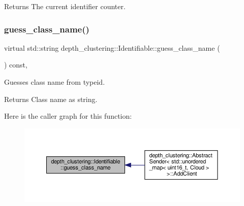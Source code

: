 \begin{DoxyReturn}{Returns}
The current identifier counter. 
\end{DoxyReturn}
\mbox{\label{classdepth__clustering_1_1Identifiable_a3de92b22eb8d77cf80a50998a84ecd8a}} 
\subsubsection{\texorpdfstring{guess\+\_\+class\+\_\+name()}{guess\_class\_name()}}
{\footnotesize\ttfamily virtual std\+::string depth\+\_\+clustering\+::\+Identifiable\+::guess\+\_\+class\+\_\+name (\begin{DoxyParamCaption}{ }\end{DoxyParamCaption}) const\hspace{0.3cm}{\ttfamily [inline]}, {\ttfamily [virtual]}}



Guesses class name from typeid. 

\begin{DoxyReturn}{Returns}
Class name as string. 
\end{DoxyReturn}
Here is the caller graph for this function\+:\nopagebreak
\begin{figure}[H]
\begin{center}
\leavevmode
\includegraphics[width=350pt]{classdepth__clustering_1_1Identifiable_a3de92b22eb8d77cf80a50998a84ecd8a_icgraph}
\end{center}
\end{figure}
\mbox{\label{classdepth__clustering_1_1Identifiable_a50f8b49ce7f7f0d9d02f31f74e0fc9e0}} 
